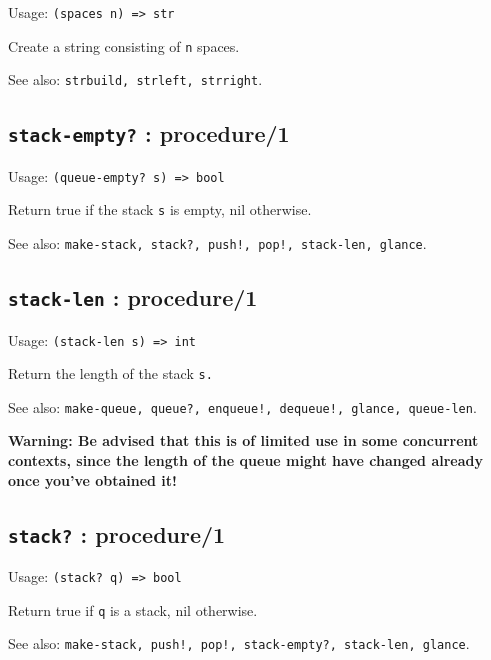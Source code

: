\documentclass[
]{article}
\newcommand{\passthrough}[1]{#1}
\begin{document}
Usage: \passthrough{\lstinline!(spaces n) => str!}

Create a string consisting of \passthrough{\lstinline!n!} spaces.

See also: \passthrough{\lstinline!strbuild, strleft, strright!}.

\hypertarget{stack-empty-procedure1-1}{%
\subsection{\texorpdfstring{\texttt{stack-empty?} :
procedure/1}{stack-empty? : procedure/1}}\label{stack-empty-procedure1-1}}

Usage: \passthrough{\lstinline!(queue-empty? s) => bool!}

Return true if the stack \passthrough{\lstinline!s!} is empty, nil
otherwise.

See also:
\passthrough{\lstinline"make-stack, stack?, push!, pop!, stack-len, glance"}.

\hypertarget{stack-len-procedure1-1}{%
\subsection{\texorpdfstring{\texttt{stack-len} :
procedure/1}{stack-len : procedure/1}}\label{stack-len-procedure1-1}}

Usage: \passthrough{\lstinline!(stack-len s) => int!}

Return the length of the stack \passthrough{\lstinline!s.!}

See also:
\passthrough{\lstinline"make-queue, queue?, enqueue!, dequeue!, glance, queue-len"}.

\textbf{Warning: Be advised that this is of limited use in some
concurrent contexts, since the length of the queue might have changed
already once you've obtained it!}

\hypertarget{stack-procedure1-1}{%
\subsection{\texorpdfstring{\texttt{stack?} :
procedure/1}{stack? : procedure/1}}\label{stack-procedure1-1}}

Usage: \passthrough{\lstinline!(stack? q) => bool!}

Return true if \passthrough{\lstinline!q!} is a stack, nil otherwise.

See also:
\passthrough{\lstinline"make-stack, push!, pop!, stack-empty?, stack-len, glance"}.
\end{document}
